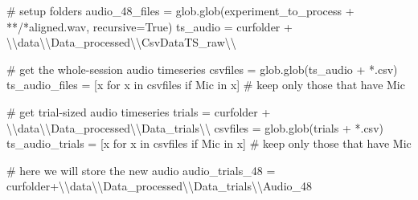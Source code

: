 \documentclass[
  letterpaper,
  DIV=11,
  numbers=noendperiod]{scrreprt}
\newenvironment{Shaded}{\begin{snugshade}}{\end{snugshade}}
\newcommand{\CharTok}[1]{\textcolor[rgb]{0.13,0.47,0.30}{#1}}
\newcommand{\CommentTok}[1]{\textcolor[rgb]{0.37,0.37,0.37}{#1}}
\newcommand{\ControlFlowTok}[1]{\textcolor[rgb]{0.00,0.23,0.31}{#1}}
\newcommand{\KeywordTok}[1]{\textcolor[rgb]{0.00,0.23,0.31}{#1}}
\newcommand{\NormalTok}[1]{\textcolor[rgb]{0.00,0.23,0.31}{#1}}
\newcommand{\OperatorTok}[1]{\textcolor[rgb]{0.37,0.37,0.37}{#1}}
\newcommand{\StringTok}[1]{\textcolor[rgb]{0.13,0.47,0.30}{#1}}
\newcommand{\VariableTok}[1]{\textcolor[rgb]{0.07,0.07,0.07}{#1}}
\begin{document}
\begin{Shaded}
\begin{Highlighting}[]
\CommentTok{\# setup folders}
\NormalTok{audio\_48\_files }\OperatorTok{=}\NormalTok{ glob.glob(experiment\_to\_process }\OperatorTok{+} \StringTok{\textquotesingle{}**/*aligned.wav\textquotesingle{}}\NormalTok{, recursive}\OperatorTok{=}\VariableTok{True}\NormalTok{)}
\NormalTok{ts\_audio }\OperatorTok{=}\NormalTok{ curfolder }\OperatorTok{+} \StringTok{\textquotesingle{}}\CharTok{\textbackslash{}\textbackslash{}}\StringTok{data}\CharTok{\textbackslash{}\textbackslash{}}\StringTok{Data\_processed}\CharTok{\textbackslash{}\textbackslash{}}\StringTok{CsvDataTS\_raw}\CharTok{\textbackslash{}\textbackslash{}}\StringTok{\textquotesingle{}}

\CommentTok{\# get the whole{-}session audio timeseries}
\NormalTok{csvfiles }\OperatorTok{=}\NormalTok{ glob.glob(ts\_audio }\OperatorTok{+} \StringTok{\textquotesingle{}*.csv\textquotesingle{}}\NormalTok{)}
\NormalTok{ts\_audio\_files }\OperatorTok{=}\NormalTok{ [x }\ControlFlowTok{for}\NormalTok{ x }\KeywordTok{in}\NormalTok{ csvfiles }\ControlFlowTok{if} \StringTok{\textquotesingle{}Mic\textquotesingle{}} \KeywordTok{in}\NormalTok{ x] }\CommentTok{\# keep only those that have Mic}

\CommentTok{\# get trial{-}sized audio timeseries}
\NormalTok{trials }\OperatorTok{=}\NormalTok{ curfolder }\OperatorTok{+} \StringTok{\textquotesingle{}}\CharTok{\textbackslash{}\textbackslash{}}\StringTok{data}\CharTok{\textbackslash{}\textbackslash{}}\StringTok{Data\_processed}\CharTok{\textbackslash{}\textbackslash{}}\StringTok{Data\_trials}\CharTok{\textbackslash{}\textbackslash{}}\StringTok{\textquotesingle{}}
\NormalTok{csvfiles }\OperatorTok{=}\NormalTok{ glob.glob(trials }\OperatorTok{+} \StringTok{\textquotesingle{}*.csv\textquotesingle{}}\NormalTok{)}
\NormalTok{ts\_audio\_trials }\OperatorTok{=}\NormalTok{ [x }\ControlFlowTok{for}\NormalTok{ x }\KeywordTok{in}\NormalTok{ csvfiles }\ControlFlowTok{if} \StringTok{\textquotesingle{}Mic\textquotesingle{}} \KeywordTok{in}\NormalTok{ x] }\CommentTok{\# keep only those that have Mic}

\CommentTok{\# here we will store the new audio}
\NormalTok{audio\_trials\_48 }\OperatorTok{=}\NormalTok{ curfolder}\OperatorTok{+}\StringTok{\textquotesingle{}}\CharTok{\textbackslash{}\textbackslash{}}\StringTok{data}\CharTok{\textbackslash{}\textbackslash{}}\StringTok{Data\_processed}\CharTok{\textbackslash{}\textbackslash{}}\StringTok{Data\_trials}\CharTok{\textbackslash{}\textbackslash{}}\StringTok{Audio\_48\textquotesingle{}}


\end{Highlighting}
\end{Shaded}
\end{document}
